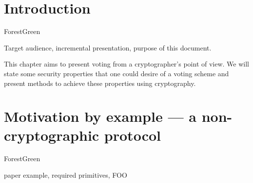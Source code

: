 \documentclass{llncs}
\newenvironment{outline}{
    \begin{color}{ForestGreen}
}{
    \end{color}
}
\begin{document}
\section{Introduction}

\begin{outline}
Target audience, incremental presentation, purpose of this document.
\end{outline}

This chapter aims to present voting from a cryptographer's point of view. We
will state some security properties that one could desire of a voting scheme and
present methods to achieve these properties using cryptography. 

\section{Motivation by example --- a non-cryptographic protocol}

\begin{outline}
paper example, required primitives, FOO
\end{outline}
\end{document}
